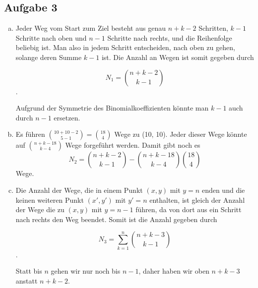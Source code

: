 \subsection*{Aufgabe 3}
\begin{enumerate}[a)]
\item
Jeder Weg vom Start zum Ziel besteht aus genau $n+k-2$ Schritten, $k-1$ Schritte nach oben und $n-1$ Schritte nach rechts, und die Reihenfolge beliebig ist. Man also in jedem Schritt entscheiden, nach oben zu gehen, solange deren Summe $k-1$ ist. Die Anzahl an Wegen ist somit gegeben durch

\[  N_1 = \binom{n+k-2}{k-1} \].

Aufgrund der Symmetrie des Binomialkoeffizienten könnte man $k-1$ auch durch $n-1$ ersetzen.

\item
Es führen $\binom{10+10-2}{5-1} = \binom{18}{4}$ Wege zu (10, 10). Jeder dieser Wege könnte auf $\binom{n+k-18}{k-4}$ Wege forgeführt werden. Damit gibt noch es
\[  N_2 = \binom{n+k-2}{k-1} -  \binom{n+k-18}{k-4}\binom{18}{4} \]
Wege.

\item
Die Anzahl der Wege, die in einem Punkt $(x,y)$ mit $y = n$ enden
und die keinen weiteren Punkt $(x', y')$ mit $y' = n$ enthalten, ist gleich der Anzahl der Wege die zu $(x, y)$ mit $y = n -1$ führen, da von dort aus ein Schritt nach rechts den Weg beendet. Somit ist die Anzahl gegeben durch

\[  N_3 = \sum_{k=1}^{n}\binom{n+k-3}{k-1} \].

Statt bis $n$ gehen wir nur noch bis $n-1$, daher haben wir oben $n+k-3$ anstatt $n+k-2$.


\end{enumerate}



